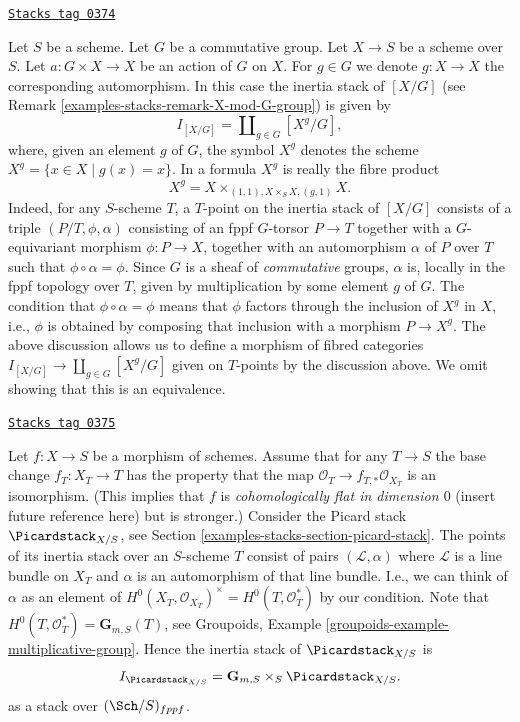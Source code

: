 \begin{example}
\label{examples-stacks-example-inertia-stack-of-X-mod-G}
\href{https://stacks.math.columbia.edu/tag/0374}{\texttt{Stacks tag 0374}}

Let $S$ be a scheme. Let $G$ be a commutative group.
Let $X \to S$ be a scheme over $S$.
Let $a : G \times X \to X$ be an action of $G$ on $X$.
For $g \in G$ we denote $g : X \to X$ the corresponding automorphism.
In this case the inertia stack of $[X/G]$ (see
Remark \ref{examples-stacks-remark-X-mod-G-group})
is given by
$$
I_{[X/G]} = \coprod\nolimits_{g\in G} [X^g/G],
$$
where, given an element $g$ of $G$, the symbol $X^g$ denotes the
scheme $X^g = \{x \in X \mid g(x) = x\}$. In a formula
$X^g$ is really the fibre
product
$$
X^g =  X \times_{(1, 1), X \times_S X, (g, 1)} X.
$$
Indeed, for any $S$-scheme $T$, a
$T$-point on the inertia stack of $[X/G]$ consists of a
triple $(P/T, \phi, \alpha)$ consisting of an fppf $G$-torsor
$P \to T$ together with a $G$-equivariant morphism
$\phi : P \to X$, together
with an automorphism $\alpha$ of $P$ over $T$ such that
$\phi \circ \alpha = \phi$.
Since $G$ is a sheaf of \emph{commutative} groups,
$\alpha$ is, locally in the fppf topology over $T$,
given by multiplication by some element $g$ of $G$.
The condition that $\phi \circ \alpha = \phi$ means that $\phi$
factors through the inclusion of $X^g$
in $X$, i.e., $\phi$ is obtained by composing that inclusion with a
morphism $P \to X^g$.
The above discussion allows us to define a morphism of fibred categories
$I_{[X/G]} \to \coprod_{g\in G} [X^g/G]$ given on $T$-points by the discussion
above. We omit showing that this is an equivalence.
\end{example}

\begin{example}
\label{examples-stacks-example-inertia-stack-of-picard}
\href{https://stacks.math.columbia.edu/tag/0375}{\texttt{Stacks tag 0375}}

Let $f : X \to S$ be a morphism of schemes.
Assume that for any $T \to S$ the base change $f_T : X_T \to T$
has the property that the map $\mathcal{O}_T \to f_{T, *}\mathcal{O}_{X_T}$
is an isomorphism. (This implies that $f$ is
{\it cohomologically flat in dimension $0$} (insert future reference here)
but is stronger.) Consider the Picard stack $\Picardstack_{X/S}$, see
Section \ref{examples-stacks-section-picard-stack}.
The points of its inertia stack over an
$S$-scheme $T$ consist of pairs $(\mathcal{L}, \alpha)$
where $\mathcal{L}$ is a line bundle
on $X_T$ and $\alpha$ is an automorphism of that line bundle.
I.e., we can think of $\alpha$ as an element of
$H^0(X_T, \mathcal{O}_{X_T})^\times = H^0(T, \mathcal{O}_T^*)$
by our condition. Note that $H^0(T, \mathcal{O}_T^*) = \mathbf{G}_{m, S}(T)$,
see Groupoids, Example \ref{groupoids-example-multiplicative-group}.
Hence the inertia stack of $\Picardstack_{X/S}$ is
$$
I_{\Picardstack_{X/S}} = \mathbf{G}_{m, S} \times_S \Picardstack_{X/S}.
$$
as a stack over $(\Sch/S)_{fppf}$.
\end{example}

